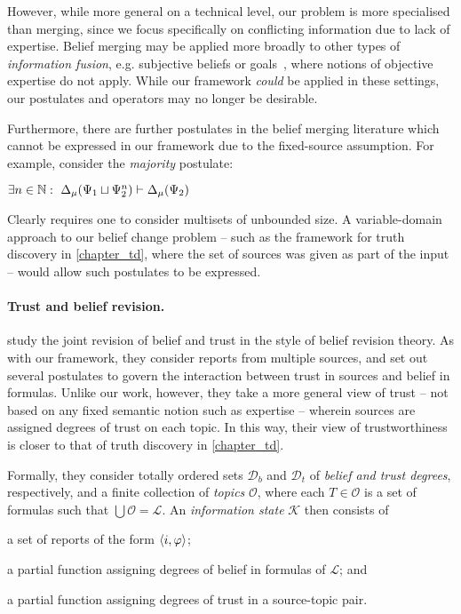 However, while more general on a technical level, our problem is more
specialised than merging, since we focus specifically on conflicting
information due to lack of expertise. Belief merging may be applied more
broadly to other types of \emph{information fusion}, e.g. subjective beliefs or
goals~\cite{gregoire_fusion_2006}, where notions of objective expertise do not
apply. While our framework \emph{could} be applied in these settings, our
postulates and operators may no longer be desirable.

Furthermore, there are further postulates in the belief merging literature
which cannot be expressed in our framework due to the fixed-source assumption.
For example, consider the \emph{majority} postulate:

\begin{axiom}[\majoritymerging{}]
    $\exists n \in \mathbb{N}:\ \Delta_\mu(\Psi_1 \sqcup \Psi_2^n) \vdash
    \Delta_\mu(\Psi_2)$
\end{axiom}

Clearly \majoritymerging{} requires one to consider multisets of unbounded
size. A variable-domain approach to our belief change problem -- such as the
framework for truth discovery in \cref{chapter_td}, where the set of sources
was given as part of the input -- would allow such postulates to be expressed.

\paragraph{Trust and belief revision.}

\textcite{yasser_21,yasser_journal_2021} study the joint revision of belief and trust in the style
of belief revision theory. As with our framework, they consider reports from
multiple sources, and set out several postulates to govern the interaction
between trust in sources and belief in formulas.
%
Unlike our work, however, they take a more general view of trust -- not based
on any fixed semantic notion such as expertise -- wherein sources are assigned
degrees of trust on each topic. In this way, their view of trustworthiness is
closer to that of truth discovery in \cref{chapter_td}.

Formally, they consider totally ordered sets $\mathcal{D}_b$ and
$\mathcal{D}_t$ of \emph{belief and trust degrees}, respectively, and a finite
collection of \emph{topics} $\mathcal{O}$, where each $T \in \mathcal{O}$ is a
set of formulas such that $\bigcup\mathcal{O} = \mathcal{L}$.\footnotemark{} An
\emph{information state} $\mathcal{K}$ then consists of
%
\begin{inlinelist}
    \item a set of reports of the form $\langle {i, \varphi} \rangle$;
    \item a partial function assigning degrees of belief in formulas of
        $\mathcal{L}$; and
    \item a partial function assigning degrees of trust in a source-topic pair.
\end{inlinelist}

